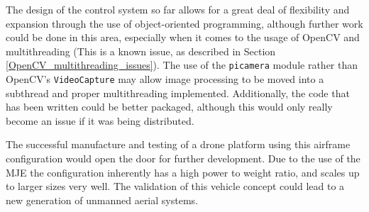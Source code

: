 \documentclass[11pt]{article}
\begin{document}
The design of the control system so far allows for a great deal of flexibility and expansion through the use of object-oriented programming, although further work could be done in this area, especially when it comes to the usage of OpenCV and multithreading (This is a known issue, as described in Section \ref{OpenCV_multithreading_issues}). The use of the \lstinline|picamera| module rather than OpenCV's \lstinline|VideoCapture| may allow image processing to be moved into a subthread and proper multithreading implemented. Additionally, the code that has been written could be better packaged, although this would only really become an issue if it was being distributed.

The successful manufacture and testing of a drone platform using this airframe configuration would open the door for further development. Due to the use of the MJE the configuration inherently has a high power to weight ratio, and scales up to larger sizes very well\cite{Ismail_paper}. The validation of this vehicle concept could lead to a new generation of unmanned aerial systems.




\newpage
\appendix
\end{document}
